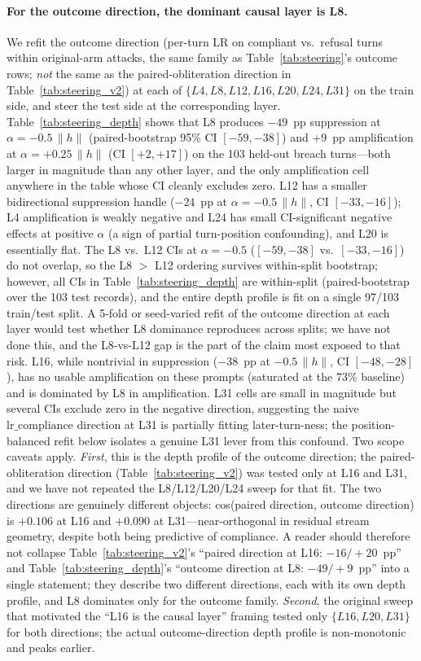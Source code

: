 \documentclass[11pt]{article}
\begin{document}
\paragraph{For the outcome direction, the dominant causal layer is L8.}
We refit the outcome direction (per-turn $\mathrm{LR}$ on compliant vs.\ refusal turns within original-arm attacks, the same family as Table~\ref{tab:steering}'s outcome rows; \emph{not} the same as the paired-obliteration direction in Table~\ref{tab:steering_v2}) at each of $\{L4, L8, L12, L16, L20, L24, L31\}$ on the train side, and steer the test side at the corresponding layer.
Table~\ref{tab:steering_depth} shows that L8 produces $-49$~pp suppression at $\alpha = -0.5\,\|h\|$ (paired-bootstrap 95\% CI $[-59,-38]$) and $+9$~pp amplification at $\alpha = +0.25\,\|h\|$ (CI $[+2,+17]$) on the 103 held-out breach turns---both larger in magnitude than any other layer, and the only amplification cell anywhere in the table whose CI cleanly excludes zero.
L12 has a smaller bidirectional suppression handle ($-24$~pp at $\alpha = -0.5\,\|h\|$, CI $[-33,-16]$); L4 amplification is weakly negative and L24 has small CI-significant negative effects at positive $\alpha$ (a sign of partial turn-position confounding), and L20 is essentially flat.
The L8 vs.\ L12 CIs at $\alpha=-0.5$ ($[-59,-38]$ vs.\ $[-33,-16]$) do not overlap, so the L8 $>$ L12 ordering survives within-split bootstrap; however, all CIs in Table~\ref{tab:steering_depth} are within-split (paired-bootstrap over the 103 test records), and the entire depth profile is fit on a single 97/103 train/test split. A 5-fold or seed-varied refit of the outcome direction at each layer would test whether L8 dominance reproduces across splits; we have not done this, and the L8-vs-L12 gap is the part of the claim most exposed to that risk.
L16, while nontrivial in suppression ($-38$~pp at $-0.5\,\|h\|$, CI $[-48,-28]$), has no usable amplification on these prompts (saturated at the 73\% baseline) and is dominated by L8 in amplification.
L31 cells are small in magnitude but several CIs exclude zero in the negative direction, suggesting the naive $\mathrm{lr\_compliance}$ direction at L31 is partially fitting later-turn-ness; the position-balanced refit below isolates a genuine L31 lever from this confound.
Two scope caveats apply.
\emph{First}, this is the depth profile of the outcome direction; the paired-obliteration direction (Table~\ref{tab:steering_v2}) was tested only at L16 and L31, and we have not repeated the L8/L12/L20/L24 sweep for that fit.
The two directions are genuinely different objects: cos(paired direction, outcome direction) is $+0.106$ at L16 and $+0.090$ at L31---near-orthogonal in residual stream geometry, despite both being predictive of compliance.
A reader should therefore not collapse Table~\ref{tab:steering_v2}'s ``paired direction at L16: $-16/+20$~pp'' and Table~\ref{tab:steering_depth}'s ``outcome direction at L8: $-49/+9$~pp'' into a single statement; they describe two different directions, each with its own depth profile, and L8 dominates only for the outcome family.
\emph{Second}, the original sweep that motivated the ``L16 is the causal layer'' framing tested only $\{L16, L20, L31\}$ for both directions; the actual outcome-direction depth profile is non-monotonic and peaks earlier.
\end{document}
